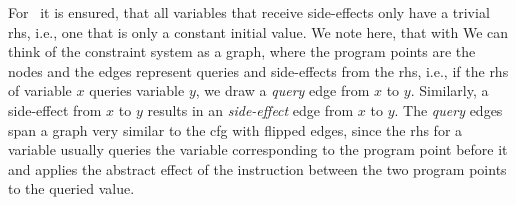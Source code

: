   For \gob\ it is ensured, that all variables that receive side-effects only have a trivial \ac{rhs}, i.e., one that is only a constant initial value.
  We note here, that with 
  We can think of the constraint system as a graph, where the program points are the nodes and the edges represent queries and side-effects from the \ac{rhs}, i.e., if the \ac{rhs} of variable $x$ queries variable $y$, we draw a \textit{query} edge from $x$ to $y$. Similarly, a side-effect from $x$ to $y$ results in an \textit{side-effect} edge from $x$ to $y$. The \textit{query} edges span a graph very similar to the \ac{cfg} with flipped edges, since the \ac{rhs} for a variable usually queries the variable corresponding to the program point before it and applies the abstract effect of the instruction between the two program points to the queried value.

